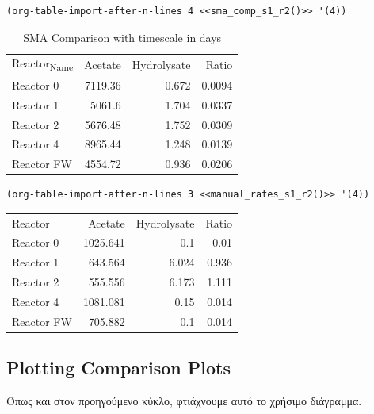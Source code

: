 \documentclass[11pt]{article}
\begin{document}
\begin{verbatim}
(org-table-import-after-n-lines 4 <<sma_comp_s1_r2()>> '(4))
\end{verbatim}

\begin{table}[htbp]
\caption{SMA Comparison with timescale in days}
\centering
\begin{tabular}{lrrr}
Reactor\textsubscript{Name} & Acetate & Hydrolysate & Ratio\\[0pt]
Reactor 0 & 7119.36 & 0.672 & 0.0094\\[0pt]
Reactor 1 & 5061.6 & 1.704 & 0.0337\\[0pt]
Reactor 2 & 5676.48 & 1.752 & 0.0309\\[0pt]
Reactor 4 & 8965.44 & 1.248 & 0.0139\\[0pt]
Reactor FW & 4554.72 & 0.936 & 0.0206\\[0pt]
\end{tabular}
\end{table}

\begin{verbatim}
(org-table-import-after-n-lines 3 <<manual_rates_s1_r2()>> '(4))
\end{verbatim}

\begin{center}
\begin{tabular}{lrrr}
Reactor & Acetate & Hydrolysate & Ratio\\[0pt]
Reactor 0 & 1025.641 & 0.1 & 0.01\\[0pt]
Reactor 1 & 643.564 & 6.024 & 0.936\\[0pt]
Reactor 2 & 555.556 & 6.173 & 1.111\\[0pt]
Reactor 4 & 1081.081 & 0.15 & 0.014\\[0pt]
Reactor FW & 705.882 & 0.1 & 0.014\\[0pt]
\end{tabular}
\end{center}

\subsection{Plotting Comparison Plots}
\label{sec:org2de023e}
Όπως και στον προηγούμενο κύκλο, φτιάχνουμε αυτό το χρήσιμο διάγραμμα.
\end{document}
